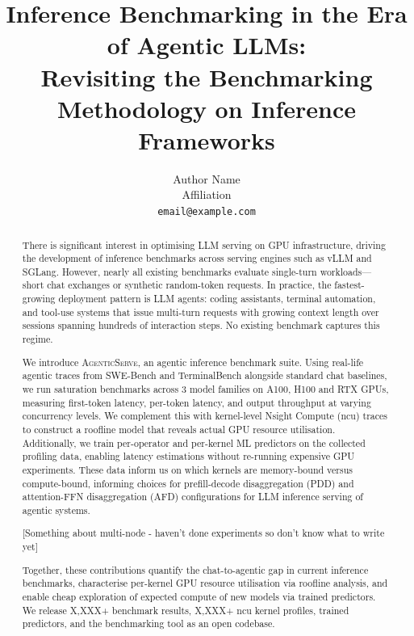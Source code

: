 \documentclass{article}
\title{Inference Benchmarking in the Era of Agentic LLMs:\\[2pt]
  {\large Revisiting the Benchmarking Methodology on Inference Frameworks}}
\author{%
  Author Name \\
  Affiliation \\
  \texttt{email@example.com} \\
}
\begin{document}
\maketitle


\begin{abstract}
There is significant interest in optimising LLM serving on GPU infrastructure, driving the development of inference benchmarks across serving engines such as vLLM and SGLang. However, nearly all existing benchmarks evaluate single-turn workloads---short chat exchanges or synthetic random-token requests. In practice, the fastest-growing deployment pattern is LLM agents: coding assistants, terminal automation, and tool-use systems that issue multi-turn requests with growing context length over sessions spanning hundreds of interaction steps. No existing benchmark captures this regime. 

We introduce \textsc{AgenticServe}, an agentic inference benchmark suite. Using real-life agentic traces from SWE-Bench and TerminalBench alongside standard chat baselines, we run saturation benchmarks across 3 model families on A100, H100 and RTX GPUs, measuring first-token latency, per-token latency, and output throughput at varying concurrency levels. We complement this with kernel-level Nsight Compute (ncu) traces to construct a roofline model that reveals actual GPU resource utilisation. Additionally, we train per-operator and per-kernel ML predictors on the collected profiling data, enabling latency estimations without re-running expensive GPU experiments. These data inform us on which kernels are memory-bound versus compute-bound, informing choices for prefill-decode disaggregation (PDD) and attention-FFN disaggregation (AFD) configurations for LLM inference serving of agentic systems.

[Something about multi-node - haven't done experiments so don't know what to write yet]

Together, these contributions quantify the chat-to-agentic gap in current inference benchmarks, characterise per-kernel GPU resource utilisation via roofline analysis, and enable cheap exploration of expected compute of new models via trained predictors. We release X{,}XXX+ benchmark results, X{,}XXX+ ncu kernel profiles, trained predictors, and the benchmarking tool as an open codebase.
\end{abstract}







\end{document}

